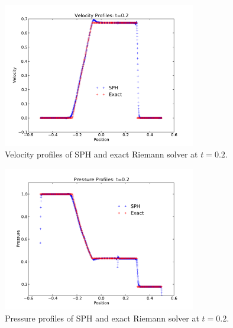\documentclass[11pt,letterpaper]{article}
\begin{document}
\begin{figure}[bth]
\centering
\includegraphics[width=0.75\textwidth]{velocity.pdf}
\caption{Velocity profiles of SPH and exact Riemann solver at $t=0.2$.}
\label{fig:velocity}
\end{figure}

\begin{figure}[bth]
\centering
\includegraphics[width=0.75\textwidth]{pressure.pdf}
\caption{Pressure profiles of SPH and exact Riemann solver at $t=0.2$.}
\label{fig:pressure}
\end{figure}
\end{document}
